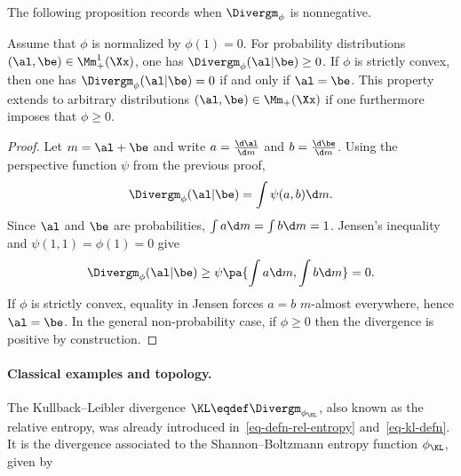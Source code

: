 The following proposition records when $\Divergm_\phi$ is nonnegative.

\begin{proposition}\label{phi-div-positive}
Assume that $\phi$ is normalized by $\phi(1)=0$. For probability distributions $(\al,\be) \in \Mm_+^1(\Xx)$, one has $\Divergm_\phi(\al|\be) \geq 0$. If $\phi$ is strictly convex, then one has $\Divergm_\phi(\al|\be)=0$ if and only if $\al=\be$.
%
This property extends to arbitrary distributions $(\al,\be) \in \Mm_+(\Xx)$ if one furthermore imposes that $\phi \geq 0$.
\end{proposition}

\begin{proof}
		Let $m=\al+\be$ and write $a=\frac{\d\al}{\d m}$ and $b=\frac{\d\be}{\d m}$. Using the perspective function $\psi$ from the previous proof,
		\[
			\Divergm_\phi(\al|\be)=\int \psi(a,b)\d m .
		\]
		Since $\al$ and $\be$ are probabilities, $\int a\d m=\int b\d m=1$. Jensen's inequality and $\psi(1,1)=\phi(1)=0$ give
		\[
			\Divergm_\phi(\al|\be)
			\geq
			\psi\pa{\int a\d m,\int b\d m}=0.
		\]
		If $\phi$ is strictly convex, equality in Jensen forces $a=b$ $m$-almost everywhere, hence $\al=\be$. In the general non-probability case, if $\phi \geq 0$ then the divergence is positive by construction.
\end{proof}

\paragraph{Classical examples and topology.}

\begin{example}
\label{ex_KLdiv}
The Kullback--Leibler divergence $\KL \eqdef \Divergm_{\phi_{\KL}}$, also known as the relative entropy, was already introduced in~\eqref{eq-defn-rel-entropy} and~\eqref{eq-kl-defn}. It is the divergence associated to the Shannon--Boltzmann entropy function $\phi_{\KL}$, given by
\end{example}

